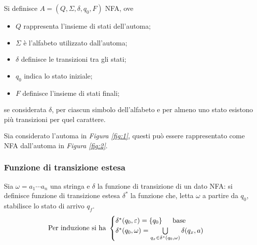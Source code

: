 \documentclass{subfiles}
\begin{document}
\begin{Definition*}
    Si definisce \(A = (Q, \Sigma, \delta, q_{0}, F)\) NFA, ove
    \begin{itemize}
        \item \emph{\(Q\)} rappresenta l'insieme di stati dell'automa;
        \item \emph{\(\Sigma\)} è l'alfabeto utilizzato dall'automa;
        \item \emph{\(\delta\)} definisce le transizioni tra gli stati;
        \item \emph{\(q_{0}\)} indica lo stato iniziale;
        \item \emph{\(F\)} definisce l'insieme di stati finali;
    \end{itemize}
    se considerata \(\delta\), per ciascun simbolo dell'alfabeto e per almeno uno stato esistono più transizioni per quel carattere.
\end{Definition*}

\begin{Example*}
    Sia considerato l'automa in \emph{Figura \eqref{fig:1}}, questi può essere rappresentato come NFA dall'automa in \emph{Figura \eqref{fig:2}}.
    
\end{Example*}

\subsubsection{Funzione di transizione estesa}
\begin{Definition*}
    Sia \(\omega = a_{1} \cdots a_{n}\) una stringa e \(\delta\) la funzione di transizione di un dato NFA:
    si definisce funzione di transizione estesa \(\delta^{*}\) la funzione che, letta \(\omega\) a partire da \(q_{0}\), stabilisce lo stato di arrivo \(q_{f}\).
    \[\text{Per induzione si ha} \begin{cases}
            \delta^{*}(q_{0}, \varepsilon) = \Set{q_{0}} \quad \text{base} \\
            \delta^{*}(q_{0}, \omega) = \bigcup\limits_{q_{x} \in \delta^{*}(q_{0}, \omega)}{\delta(q_{x}, a)}
        \end{cases}\]
\end{Definition*}
\clearpage
\end{document}

